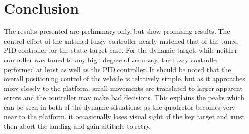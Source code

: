\documentclass[]{aiaa-tc}
\begin{document}
\section{Conclusion}
The results presented are preliminary only, but show promising results. The control effort of the untuned fuzzy controller nearly matched that of the tuned PID controller for the  static target case. For the dynamic target, while neither controller was tuned to any high degree of accuracy, the fuzzy controller performed at least as well as the PID controller. It should be noted that the overall positioning control of the
vehicle is relatively simple, but as it approaches more closely to the platform, small movements are translated to larger apparent errors and the controller may make bad decisions. This explains the peaks which can be seen in both of the dynamic situations; as the quadrotor becomes very near to the platform, it occasionally loses visual sight of the key target and must then abort the landing and gain altitude to retry.
\end{document}
